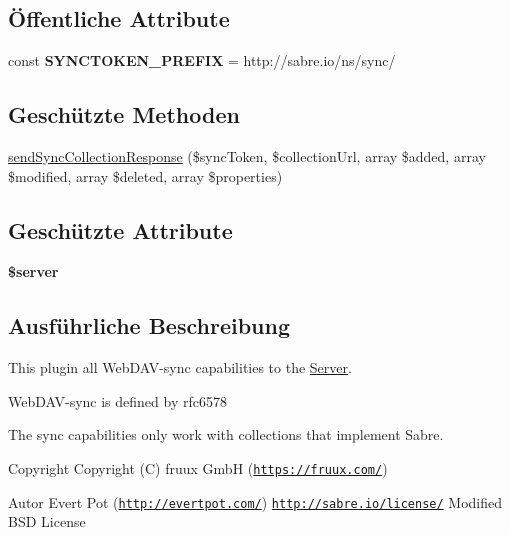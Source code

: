 \subsection*{Öffentliche Attribute}
\begin{DoxyCompactItemize}
\item 
\mbox{\label{class_sabre_1_1_d_a_v_1_1_sync_1_1_plugin_a0ae4dd08d9d8a4ce72122b25a76483fb}} 
const {\bfseries S\+Y\+N\+C\+T\+O\+K\+E\+N\+\_\+\+P\+R\+E\+F\+IX} = \textquotesingle{}http\+://sabre.\+io/ns/sync/\textquotesingle{}
\end{DoxyCompactItemize}
\subsection*{Geschützte Methoden}
\begin{DoxyCompactItemize}
\item 
\mbox{\hyperlink{class_sabre_1_1_d_a_v_1_1_sync_1_1_plugin_a5175d698d1de1ab6a6478faf8de1e6a5}{send\+Sync\+Collection\+Response}} (\$sync\+Token, \$collection\+Url, array \$added, array \$modified, array \$deleted, array \$properties)
\end{DoxyCompactItemize}
\subsection*{Geschützte Attribute}
\begin{DoxyCompactItemize}
\item 
\mbox{\label{class_sabre_1_1_d_a_v_1_1_sync_1_1_plugin_a5b7531fc127e630e8be0fb7ef6f9164f}} 
{\bfseries \$server}
\end{DoxyCompactItemize}


\subsection{Ausführliche Beschreibung}
This plugin all Web\+D\+A\+V-\/sync capabilities to the \mbox{\hyperlink{class_sabre_1_1_d_a_v_1_1_server}{Server}}.

Web\+D\+A\+V-\/sync is defined by rfc6578

The sync capabilities only work with collections that implement Sabre.

\begin{DoxyCopyright}{Copyright}
Copyright (C) fruux GmbH (\href{https://fruux.com/}{\tt https\+://fruux.\+com/}) 
\end{DoxyCopyright}
\begin{DoxyAuthor}{Autor}
Evert Pot (\href{http://evertpot.com/}{\tt http\+://evertpot.\+com/})  \href{http://sabre.io/license/}{\tt http\+://sabre.\+io/license/} Modified B\+SD License 
\end{DoxyAuthor}


